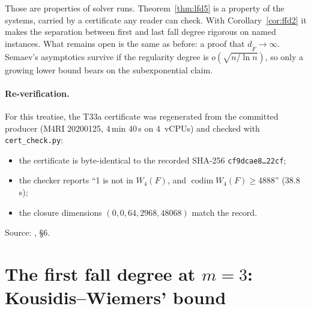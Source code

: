 \begin{table}[t]
\centering\small

\caption[]{The $m=2$ rows of Kousidis and Wiemers' Table~1~\cite{kousidis2019}
(F4, averages over ten repetitions; $n'=\lceil n/2\rceil$; time in
seconds, memory in GB), transcribed from the published table, beside the
last fall degree of our instances at the same $n$
(Table~\ref{tab:fd-binary}). Superscripts give the subspace family. Their
$m=3,4$ rows ($D_{\rm ff}=D_{\rm reg}=7$ and $13$, $n\le21$) concern
$\Sem4$ and $\Sem5$; the $m=3$ first fall degree is reproduced in
\S\ref{sec:fd-kw3}.}
\label{tab:fd-kw}
\end{table}

Those are properties of solver runs. Theorem~\ref{thm:lfd5} is a property
of the systems, carried by a certificate any reader can check. With
Corollary~\ref{cor:ffd2} it makes the separation between first and last
fall degree rigorous on named instances. What remains open is the same
as before: a proof that $d_{\tilde F}\to\infty$. Semaev's asymptotics
survive if the regularity degree is $o(\sqrt{n/\ln n})$, so only a growing
lower bound bears on the subexponential claim.

\paragraph{Re-verification.} For this treatise, the T33a certificate was
regenerated from the committed producer (M4RI 20200125, 4\,min 40\,s on
4~vCPUs) and checked with \texttt{cert\_check.py}:
\begin{itemize}
\item the certificate is byte-identical to the recorded SHA-256
  \texttt{cf9dcae8\ldots22cf};
\item the checker reports ``1 is not in $W_4(F)$, and
  $\operatorname{codim}W_4(F)\ge4888$'' (38.8\,s);
\item the closure dimensions $(0,0,64,2968,48068)$ match the record.
\end{itemize}
Source: , \S6.

\section{The first fall degree at $m=3$: Kousidis--Wiemers' bound}\label{sec:fd-kw3}

